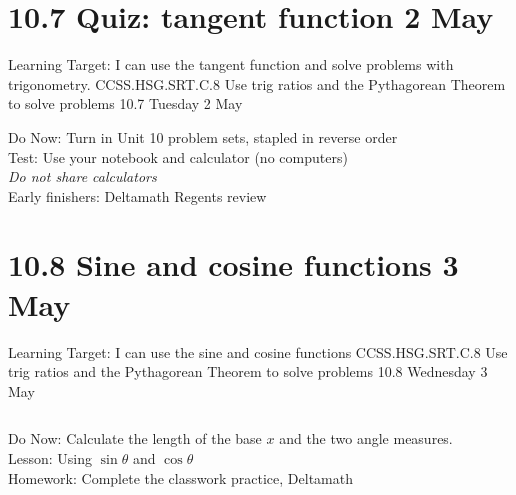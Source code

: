 \documentclass[onlytextwidth, aspectratio=169]{beamer}
\begin{document}
\section{10.7 Quiz: tangent function \hfill 2 May \,}
\begin{frame}{Learning Target: I can use the tangent function and solve problems with trigonometry.}
  {CCSS.HSG.SRT.C.8 Use trig ratios and the Pythagorean Theorem to solve problems \hfill \alert{10.7 Tuesday 2 May}}

    Do Now: Turn in Unit 10 problem sets, stapled in reverse order \\[0.5cm]
    Test: Use your notebook and calculator (no computers) \\[0.5cm]
    \emph{Do not share calculators} \\[0.5cm]
    Early finishers: Deltamath Regents review
\end{frame}

\section{10.8 Sine and cosine functions \hfill 3 May \,}
\begin{frame}{Learning Target: I can use the sine and cosine functions}
  {CCSS.HSG.SRT.C.8 Use trig ratios and the Pythagorean Theorem to solve problems \hfill \alert{10.8 Wednesday 3 May}}
  \begin{columns}
    Do Now: Calculate the length of the base $x$ and the two angle measures. \\[0.5cm]
    Lesson: Using $\sin \theta$ and $\cos \theta$ \\[0.5cm]
    Homework: Complete the classwork practice, Deltamath \\
    \begin{flushright}
    \end{flushright}
  \end{columns}
\end{frame}
\end{document}
